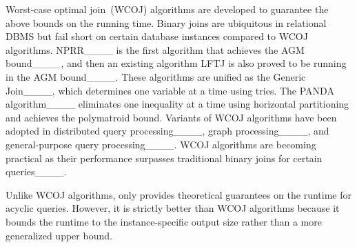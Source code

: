 Worst-case optimal join~(WCOJ) algorithms are developed to guarantee the above bounds on the running time. Binary joins are ubiquitous in relational DBMS but fail short on certain database instances compared to WCOJ algorithms. NPRR____ is the first algorithm that achieves the AGM bound____, and then an existing algorithm LFTJ is also proved to be running in the AGM bound____. These algorithms are unified as the Generic Join____, which determines one variable at a time using tries. The PANDA algorithm____ eliminates one inequality at a time using horizontal partitioning and achieves the polymatroid bound. Variants of WCOJ algorithms have been adopted in distributed query processing____, graph  processing____, and general-purpose query processing____. WCOJ algorithms are becoming practical as their performance surpasses traditional binary joins for certain queries____.

Unlike WCOJ algorithms, \RPT only provides theoretical guarantees on the runtime for acyclic queries. However, it is strictly better than WCOJ algorithms because it bounds the runtime to the instance-specific output size rather than a more generalized upper bound.